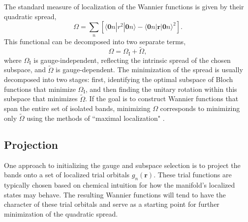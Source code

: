 \documentclass[galley,aps,pra,10pt,amsmath,amssymb,
    superscriptaddress,nofootinbib,longbibliography]{revtex4-2}
\def\Red#1{\textcolor{red}{#1}}
\newcounter{comm}
\newcommand{\seclab}[1]{\label{sec:#1}{\Red{\small\;\;[sec:~#1]}}}
\newcommand{\seclab}[1]{\label{sec:#1}}
\begin{document}
The standard measure of localization of the Wannier functions is given by their quadratic spread,
\begin{equation}
    \Omega = \sum_n \left[ \langle \mathbf{0} n | r^2 | \mathbf{0}n \rangle - \langle \mathbf{0} n | \mathbf{r} | \mathbf{0} n \rangle^2 \right].
\end{equation}
This functional can be decomposed into two separate terms,
\begin{equation}
    \Omega = \Omega_\textrm{I} + \widetilde{\Omega},
\end{equation}
where $\Omega_\textrm{I}$ is gauge-independent, reflecting the intrinsic spread of the chosen subspace, and $\widetilde{\Omega}$ is gauge-dependent. The minimization of the spread is usually decomposed into two stages: first, identifying the optimal subspace of Bloch functions that minimize $\Omega_\textrm{I}$, and then finding the unitary rotation within this subspace that minimizes $\widetilde{\Omega}$. If the goal is to construct Wannier functions that span the entire set of isolated bands, minimizing $\Omega$ corresponds to minimizing only $\widetilde{\Omega}$ using the methods of ``maximal localization" \cite{marzari1997}.  

\subsection{Projection}
\seclab{proj}

One approach to initializing the gauge and subspace selection is to project the bands onto a set of localized trial orbitals $g_n(\mathbf{r})$. These trial functions are typically chosen based on chemical intuition for how the manifold's localized states may behave. The resulting Wannier functions will tend to have the character of these trial orbitals and serve as a starting point for further minimization of the quadratic spread. 
\end{document}
